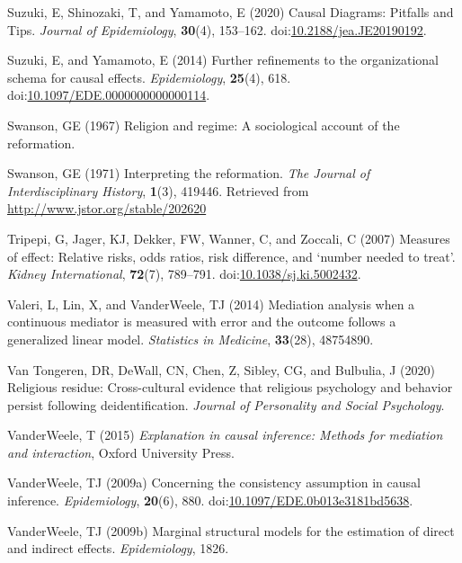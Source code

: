 \documentclass[
  singlecolumn]{article}
\newlength{\cslhangindent}
\newenvironment{CSLReferences}[2] %
 {\begin{list}{}{%
  \setlength{\itemindent}{0pt}
  \setlength{\leftmargin}{0pt}
  \setlength{\parsep}{0pt}
  \ifodd #1
   \setlength{\leftmargin}{\cslhangindent}
   \setlength{\itemindent}{-1\cslhangindent}
  \fi
  \setlength{\itemsep}{#2\baselineskip}}}
 {\end{list}}
\begin{document}
\begin{CSLReferences}{1}{0}
Suzuki, E, Shinozaki, T, and Yamamoto, E (2020) Causal Diagrams:
Pitfalls and Tips. \emph{Journal of Epidemiology}, \textbf{30}(4),
153--162.
doi:\href{https://doi.org/10.2188/jea.JE20190192}{10.2188/jea.JE20190192}.

Suzuki, E, and Yamamoto, E (2014) Further refinements to the
organizational schema for causal effects. \emph{Epidemiology},
\textbf{25}(4), 618.
doi:\href{https://doi.org/10.1097/EDE.0000000000000114}{10.1097/EDE.0000000000000114}.

Swanson, GE (1967) Religion and regime: A sociological account of the
reformation.

Swanson, GE (1971) Interpreting the reformation. \emph{The Journal of
Interdisciplinary History}, \textbf{1}(3), 419446. Retrieved from
\url{http://www.jstor.org/stable/202620}

Tripepi, G, Jager, KJ, Dekker, FW, Wanner, C, and Zoccali, C (2007)
Measures of effect: Relative risks, odds ratios, risk difference, and
{`}number needed to treat{'}. \emph{Kidney International},
\textbf{72}(7), 789--791.
doi:\href{https://doi.org/10.1038/sj.ki.5002432}{10.1038/sj.ki.5002432}.

Valeri, L, Lin, X, and VanderWeele, TJ (2014) Mediation analysis when a
continuous mediator is measured with error and the outcome follows a
generalized linear model. \emph{Statistics in Medicine},
\textbf{33}(28), 48754890.

Van Tongeren, DR, DeWall, CN, Chen, Z, Sibley, CG, and Bulbulia, J
(2020) Religious residue: Cross-cultural evidence that religious
psychology and behavior persist following deidentification.
\emph{Journal of Personality and Social Psychology}.

VanderWeele, T (2015) \emph{Explanation in causal inference: Methods for
mediation and interaction}, Oxford University Press.

VanderWeele, TJ (2009a) Concerning the consistency assumption in causal
inference. \emph{Epidemiology}, \textbf{20}(6), 880.
doi:\href{https://doi.org/10.1097/EDE.0b013e3181bd5638}{10.1097/EDE.0b013e3181bd5638}.

VanderWeele, TJ (2009b) Marginal structural models for the estimation of
direct and indirect effects. \emph{Epidemiology}, 1826.


\end{CSLReferences}
\end{document}
